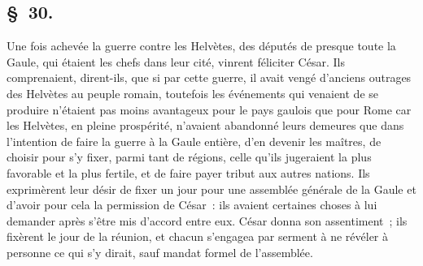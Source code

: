 \documentclass[french,twoside]{book} %
\begin{document}
\subsection[{§ 30.}]{ \textsc{§ 30.} }
\noindent Une fois achevée la guerre contre les Helvètes, des députés de presque toute la Gaule, qui étaient les chefs dans leur cité, vinrent féliciter César. Ils comprenaient, dirent-ils, que si par cette guerre, il avait vengé d’anciens outrages des Helvètes au peuple romain, toutefois les événements qui venaient de se produire n’étaient pas moins avantageux pour le pays gaulois que pour Rome car les Helvètes, en pleine prospérité, n’avaient abandonné leurs demeures que dans l’intention de faire la guerre à la Gaule entière, d’en devenir les maîtres, de choisir pour s’y fixer, parmi tant de régions, celle qu’ils jugeraient la plus favorable et la plus fertile, et de faire payer tribut aux autres nations. Ils exprimèrent leur désir de fixer un jour pour une assemblée générale de la Gaule et d’avoir pour cela la permission de César : ils avaient certaines choses à lui demander après s’être mis d’accord entre eux. César donna son assentiment ; ils fixèrent le jour de la réunion, et chacun s’engagea par serment à ne révéler à personne ce qui s’y dirait, sauf mandat formel de l’assemblée.
\end{document}
